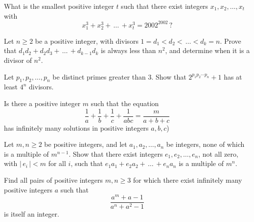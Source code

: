 \item[\textbf{N1.}]What is the smallest positive integer $t$ such that there exist integers $x_1,x_2,\ldots,x_t$ with  \[x^3_1+x^3_2+\,\ldots\,+x^3_t=2002^{2002}\,?\]

\item[\textbf{N2.}]Let $n\geq2$ be a positive integer, with divisors $1=d_1<d_2<\,\ldots<d_k=n$.  Prove that $d_1d_2+d_2d_3+\,\ldots\,+d_{k-1}d_k$ is always less than $n^2$,  and determine when it is a divisor of $n^2$.

\item[\textbf{N3.}]Let $p_1,p_2,\ldots,p_n$ be distinct primes greater than $3$. Show that $2^{p_1p_2\cdots p_n}+1$ has at least $4^n$ divisors.

\item[\textbf{N4.}]Is there a positive integer $m$ such that the equation \[ {\frac{1}{a}}+{\frac{1}{b}}+{\frac{1}{c}}+{\frac{1}{abc}}={\frac{m}{a+b+c}}  \] has infinitely many solutions in positive integers $a,b,c$)

\item[\textbf{N5.}]Let $m,n\geq2$ be positive integers, and let $a_1,a_2,\ldots ,a_n$ be integers, none of which is a multiple of $m^{n-1}$.  Show that there exist integers $e_1,e_2,\ldots,e_n$,  not all zero, with $\left|{\,e}_i\,\right|<m$ for all $i$,  such that $e_1a_1+e_2a_2+\,\ldots\,+e_na_n$ is a multiple of $m^n$.

\item[\textbf{N6.}]Find all pairs of positive integers $m,n\geq3$ for which there exist infinitely many positive integers $a$ such that \[ \frac{a^m+a-1}{a^n+a^2-1}  \] is itself an integer.
